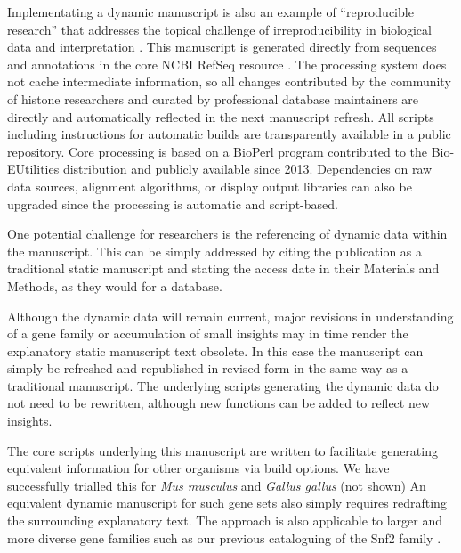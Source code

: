   Implementating a dynamic manuscript is also an example of ``reproducible research''
  \citep{reproducible-research-bioinformatics,reproducible-research-law}
  that addresses the topical challenge of irreproducibility in biological data
  and interpretation \citep{ErrorProne2012,OpenPrograms2012}.
  This manuscript is generated directly from sequences and annotations
  in the core NCBI RefSeq resource \citep{PruittRefseq2014}.
  The processing system does not cache intermediate information,
  so all changes contributed by the community of histone researchers
  and curated by professional database maintainers
  are directly and automatically reflected in the next manuscript refresh.
  All scripts including instructions for automatic builds
  are transparently available in a public repository.
  Core processing is based on a BioPerl program contributed to the Bio-EUtilities distribution
  and publicly available since 2013.
  Dependencies on raw data sources, alignment algorithms, or display output libraries
  can also be upgraded since the processing is automatic and script-based.

  One potential challenge for researchers is the referencing of dynamic data within the manuscript.
  This can be simply addressed by citing the publication as a traditional static manuscript
  and stating the access date in their Materials and Methods, as they would for a database.

  Although the dynamic data will remain current,
  major revisions in understanding of a gene family or accumulation of small insights
  may in time render the explanatory static manuscript text obsolete.
  In this case the manuscript can simply be refreshed and republished in revised form
  in the same way as a traditional manuscript.
  The underlying scripts generating the dynamic data do not need to be rewritten, 
  although new functions can be added to reflect new insights.

  The core scripts underlying this manuscript are written to facilitate generating
  equivalent information for other organisms via build options.
  We have successfully trialled this for \textit{Mus musculus} and \textit{Gallus gallus} (not shown)
  An equivalent dynamic manuscript for such gene sets
  also simply requires redrafting the surrounding explanatory text.
  The approach is also applicable to larger and more diverse gene families such as
  our previous cataloguing of the Snf2 family \citep{andrew-snf2-catalogue}.
